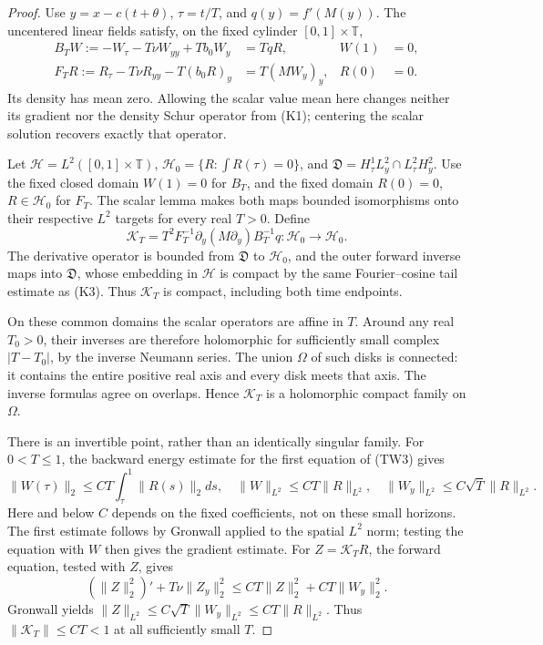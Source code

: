 \documentclass[11pt,a4paper]{article}
\begin{document}
\begin{proof}
Use $y=x-c(t+\theta)$, $\tau=t/T$, and $q(y)=f'(M(y))$.
The uncentered linear fields satisfy, on the fixed cylinder
$[0,1]\times\mathbb T$,
\begin{equation}\tag{TW3}\label{TW3}
 \begin{aligned}
 B_TW:=-W_\tau-T\nu W_{yy}+Tb_0W_y&=TqR, &W(1)&=0,\\
 F_TR:=R_\tau-T\nu R_{yy}-T(b_0R)_y&=T(MW_y)_y, &R(0)&=0.
 \end{aligned}
\end{equation}
Its density has mean zero. Allowing the scalar value mean here
changes neither its gradient nor the density Schur operator from
(K1); centering the scalar solution recovers exactly that operator.

Let $\mathcal H=L^2([0,1]\times\mathbb T)$,
$\mathcal H_0=\{R:\int R(\tau)=0\}$, and
$\mathfrak D=H^1_\tau L^2_y\cap L^2_\tau H^2_y$.
Use the fixed closed domain $W(1)=0$ for $B_T$, and the fixed
domain $R(0)=0$, $R\in\mathcal H_0$ for $F_T$.
The scalar lemma makes both maps bounded isomorphisms onto their
respective $L^2$ targets for every real $T>0$. Define
\begin{equation}\tag{TW4}\label{TW4}
 \mathcal K_T=T^2F_T^{-1}\partial_y(M\partial_y)B_T^{-1}q
             :\mathcal H_0\longrightarrow\mathcal H_0.
\end{equation}
The derivative operator is bounded from $\mathfrak D$ to $\mathcal H_0$,
and the outer forward inverse maps into $\mathfrak D$, whose embedding
in $\mathcal H$ is compact by the same Fourier--cosine tail estimate
as (K3). Thus $\mathcal K_T$ is compact, including both time endpoints.

On these common domains the scalar operators are affine in $T$.
Around any real $T_0>0$, their inverses are therefore holomorphic
for sufficiently small complex $|T-T_0|$, by the inverse Neumann
series. The union $\Omega$ of such disks is connected: it contains
the entire positive real axis and every disk meets that axis.
The inverse formulas agree on overlaps. Hence $\mathcal K_T$ is
a holomorphic compact family on $\Omega$.

There is an invertible point, rather than an identically singular
family. For $0<T\leq1$, the backward energy estimate for the first
equation of (TW3) gives
\[
 \|W(\tau)\|_2\leq CT\int_\tau^1\|R(s)\|_2ds,
 \quad \|W\|_{L^2}\leq CT\|R\|_{L^2},
 \quad \|W_y\|_{L^2}\leq C\sqrt T\|R\|_{L^2}.
\]
Here and below $C$ depends on the fixed coefficients, not on these
small horizons. The first estimate follows by Gronwall applied to
the spatial $L^2$ norm; testing the equation with $W$ then gives
the gradient estimate. For $Z=\mathcal K_TR$, the forward equation,
tested with $Z$, gives
\[
 (\|Z\|_2^2)' +T\nu\|Z_y\|_2^2
       \leq CT\|Z\|_2^2+CT\|W_y\|_2^2.
\]
Gronwall yields
$\|Z\|_{L^2}\leq C\sqrt T\|W_y\|_{L^2}\leq CT\|R\|_{L^2}$.
Thus $\|\mathcal K_T\|\leq CT<1$ at all sufficiently small $T$.


\end{proof}
\end{document}
